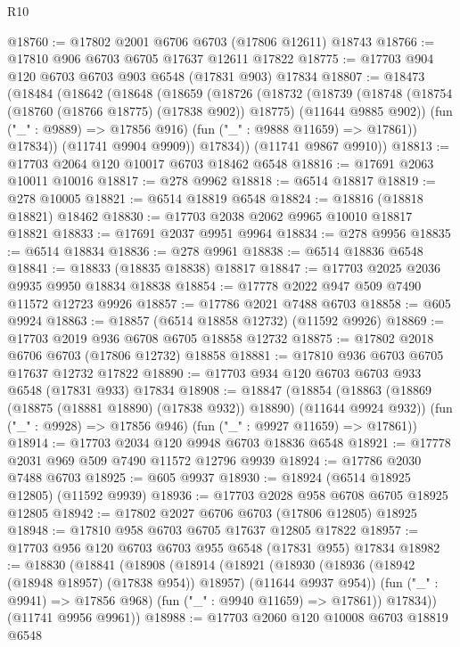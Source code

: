 \begin{lexlean}{R10}
\begin{coremodule}
{{{{{{{{{{{{{{{{{{{{{{{{{{{{{{{{{{{{{{{{{{{{{{{{{{{{{{{{{{{{{{{{{{{{{{{{{{{{{{{{{{{{@18760 := @17802 @2001 @6706 @6703 (@17806 @12611) @18743
@18766 := @17810 @906 @6703 @6705 @17637 @12611 @17822
@18775 := @17703 @904 @120 @6703 @6703 @903 @6548 (@17831 @903) @17834
@18807 := @18473
    (@18484
      (@18642
        (@18648
          (@18659
            (@18726
              (@18732
                (@18739
                  (@18748
                    (@18754 (@18760 (@18766 @18775) (@17838 @902)) @18775)
                    (@11644 @9885 @902))
                  (fun ("_" : @9889) => @17856 @916)
                  (fun ("_" : @9888 @11659) => @17861))
                @17834))
            (@11741 @9904 @9909))
          @17834))
      (@11741 @9867 @9910))
@18813 := @17703 @2064 @120 @10017 @6703 @18462 @6548
@18816 := @17691 @2063 @10011 @10016
@18817 := @278 @9962
@18818 := @6514 @18817
@18819 := @278 @10005
@18821 := @6514 @18819 @6548
@18824 := @18816 (@18818 @18821) @18462
@18830 := @17703 @2038 @2062 @9965 @10010 @18817 @18821
@18833 := @17691 @2037 @9951 @9964
@18834 := @278 @9956
@18835 := @6514 @18834
@18836 := @278 @9961
@18838 := @6514 @18836 @6548
@18841 := @18833 (@18835 @18838) @18817
@18847 := @17703 @2025 @2036 @9935 @9950 @18834 @18838
@18854 := @17778 @2022 @947 @509 @7490 @11572 @12723 @9926
@18857 := @17786 @2021 @7488 @6703
@18858 := @605 @9924
@18863 := @18857 (@6514 @18858 @12732) (@11592 @9926)
@18869 := @17703 @2019 @936 @6708 @6705 @18858 @12732
@18875 := @17802 @2018 @6706 @6703 (@17806 @12732) @18858
@18881 := @17810 @936 @6703 @6705 @17637 @12732 @17822
@18890 := @17703 @934 @120 @6703 @6703 @933 @6548 (@17831 @933) @17834
@18908 := @18847
    (@18854
      (@18863 (@18869 (@18875 (@18881 @18890) (@17838 @932)) @18890) (@11644 @9924 @932))
      (fun ("_" : @9928) => @17856 @946)
      (fun ("_" : @9927 @11659) => @17861))
@18914 := @17703 @2034 @120 @9948 @6703 @18836 @6548
@18921 := @17778 @2031 @969 @509 @7490 @11572 @12796 @9939
@18924 := @17786 @2030 @7488 @6703
@18925 := @605 @9937
@18930 := @18924 (@6514 @18925 @12805) (@11592 @9939)
@18936 := @17703 @2028 @958 @6708 @6705 @18925 @12805
@18942 := @17802 @2027 @6706 @6703 (@17806 @12805) @18925
@18948 := @17810 @958 @6703 @6705 @17637 @12805 @17822
@18957 := @17703 @956 @120 @6703 @6703 @955 @6548 (@17831 @955) @17834
@18982 := @18830
    (@18841
      (@18908
        (@18914
          (@18921
            (@18930 (@18936 (@18942 (@18948 @18957) (@17838 @954)) @18957) (@11644 @9937 @954))
            (fun ("_" : @9941) => @17856 @968)
            (fun ("_" : @9940 @11659) => @17861))
          @17834))
      (@11741 @9956 @9961))
@18988 := @17703 @2060 @120 @10008 @6703 @18819 @6548
}}}}}}}}}}}}}}}}}}}}}}}}}}}}}}}}}}}}}}}}}}}}}}}}}}}}}}}}}}}}}}}}}}}}}}}}}}}}}}}}}}}}
\end{coremodule}
\end{lexlean}
